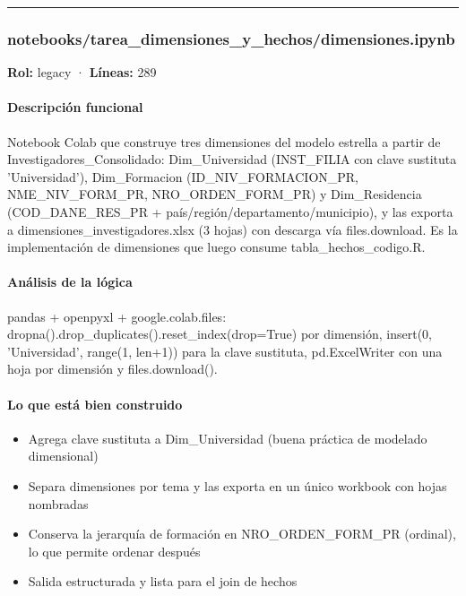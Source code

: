 \medskip
\hrule

\subsubsection{notebooks/tarea\_dimensiones\_y\_hechos/dimensiones.ipynb}
\textbf{Rol:} legacy · \textbf{Líneas:} 289

\paragraph{Descripción funcional}
Notebook Colab que construye tres dimensiones del modelo estrella a partir de Investigadores\_Consolidado: Dim\_Universidad (INST\_FILIA con clave sustituta 'Universidad'), Dim\_Formacion (ID\_NIV\_FORMACION\_PR, NME\_NIV\_FORM\_PR, NRO\_ORDEN\_FORM\_PR) y Dim\_Residencia (COD\_DANE\_RES\_PR + país/región/departamento/municipio), y las exporta a dimensiones\_investigadores.xlsx (3 hojas) con descarga vía files.download. Es la implementación de dimensiones que luego consume tabla\_hechos\_codigo.R.

\paragraph{Análisis de la lógica}
pandas + openpyxl + google.colab.files: dropna().drop\_duplicates().reset\_index(drop=True) por dimensión, insert(0, 'Universidad', range(1, len+1)) para la clave sustituta, pd.ExcelWriter con una hoja por dimensión y files.download().

\paragraph{Lo que está bien construido}
\begin{itemize}
  \item Agrega clave sustituta a Dim\_Universidad (buena práctica de modelado dimensional)
  \item Separa dimensiones por tema y las exporta en un único workbook con hojas nombradas
  \item Conserva la jerarquía de formación en NRO\_ORDEN\_FORM\_PR (ordinal), lo que permite ordenar después
  \item Salida estructurada y lista para el join de hechos
\end{itemize}

